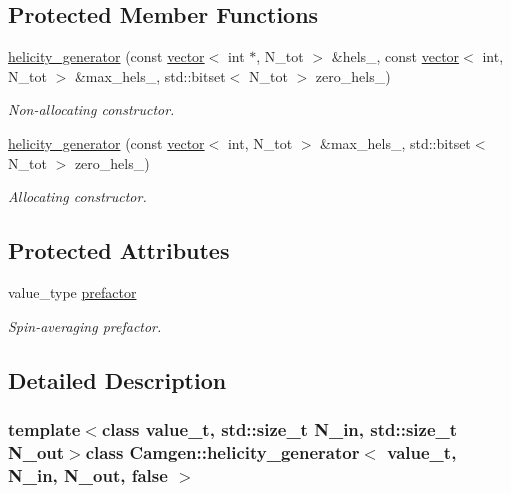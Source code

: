 \subsection*{Protected Member Functions}
\begin{DoxyCompactItemize}
\item 
\hyperlink{a00271_a7a9e24ee4ac64da2657523792729c8b1}{helicity\+\_\+generator} (const \hyperlink{a00579}{vector}$<$ int $\ast$, N\+\_\+tot $>$ \&hels\+\_\+, const \hyperlink{a00579}{vector}$<$ int, N\+\_\+tot $>$ \&max\+\_\+hels\+\_\+, std\+::bitset$<$ N\+\_\+tot $>$ zero\+\_\+hels\+\_\+)
\begin{DoxyCompactList}\small\item\em Non-\/allocating constructor. \end{DoxyCompactList}\item 
\hyperlink{a00271_a88704ef647b316ee8b893df31b64035a}{helicity\+\_\+generator} (const \hyperlink{a00579}{vector}$<$ int, N\+\_\+tot $>$ \&max\+\_\+hels\+\_\+, std\+::bitset$<$ N\+\_\+tot $>$ zero\+\_\+hels\+\_\+)
\begin{DoxyCompactList}\small\item\em Allocating constructor. \end{DoxyCompactList}\end{DoxyCompactItemize}
\subsection*{Protected Attributes}
\begin{DoxyCompactItemize}
\item 
\hypertarget{a00271_aabfd768deccb37d34c66bd67ab6e6b5b}{}value\+\_\+type \hyperlink{a00271_aabfd768deccb37d34c66bd67ab6e6b5b}{prefactor}\label{a00271_aabfd768deccb37d34c66bd67ab6e6b5b}

\begin{DoxyCompactList}\small\item\em Spin-\/averaging prefactor. \end{DoxyCompactList}\end{DoxyCompactItemize}


\subsection{Detailed Description}
\subsubsection*{template$<$class value\+\_\+t, std\+::size\+\_\+t N\+\_\+in, std\+::size\+\_\+t N\+\_\+out$>$class Camgen\+::helicity\+\_\+generator$<$ value\+\_\+t, N\+\_\+in, N\+\_\+out, false $>$}

